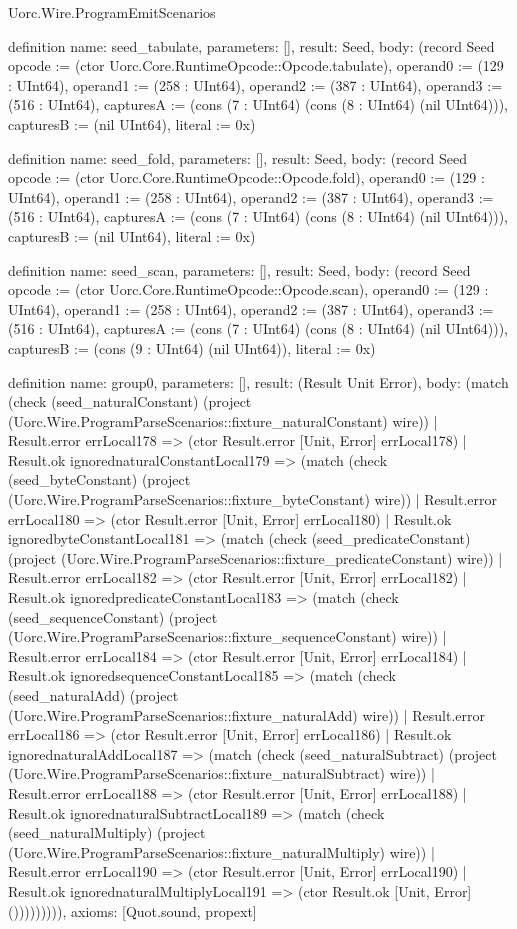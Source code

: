 \begin{lexlean}{Uorc.Wire.ProgramEmitScenarios}
\begin{semanticmodule}
definition{
  name: seed_tabulate,
  parameters: [],
  result: Seed,
  body: (record Seed {opcode := (ctor Uorc.Core.RuntimeOpcode::Opcode.tabulate), operand0 := (129 : UInt64), operand1 := (258 : UInt64), operand2 := (387 : UInt64), operand3 := (516 : UInt64), capturesA := (cons (7 : UInt64) (cons (8 : UInt64) (nil UInt64))), capturesB := (nil UInt64), literal := 0x})
}

definition{
  name: seed_fold,
  parameters: [],
  result: Seed,
  body: (record Seed {opcode := (ctor Uorc.Core.RuntimeOpcode::Opcode.fold), operand0 := (129 : UInt64), operand1 := (258 : UInt64), operand2 := (387 : UInt64), operand3 := (516 : UInt64), capturesA := (cons (7 : UInt64) (cons (8 : UInt64) (nil UInt64))), capturesB := (nil UInt64), literal := 0x})
}

definition{
  name: seed_scan,
  parameters: [],
  result: Seed,
  body: (record Seed {opcode := (ctor Uorc.Core.RuntimeOpcode::Opcode.scan), operand0 := (129 : UInt64), operand1 := (258 : UInt64), operand2 := (387 : UInt64), operand3 := (516 : UInt64), capturesA := (cons (7 : UInt64) (cons (8 : UInt64) (nil UInt64))), capturesB := (cons (9 : UInt64) (nil UInt64)), literal := 0x})
}

definition{
  name: group0,
  parameters: [],
  result: (Result Unit Error),
  body: (match (check (seed_naturalConstant) (project (Uorc.Wire.ProgramParseScenarios::fixture_naturalConstant) wire))
    | Result.error errLocal178 => (ctor Result.error [Unit, Error] errLocal178)
    | Result.ok ignorednaturalConstantLocal179 => (match (check (seed_byteConstant) (project (Uorc.Wire.ProgramParseScenarios::fixture_byteConstant) wire))
      | Result.error errLocal180 => (ctor Result.error [Unit, Error] errLocal180)
      | Result.ok ignoredbyteConstantLocal181 => (match (check (seed_predicateConstant) (project (Uorc.Wire.ProgramParseScenarios::fixture_predicateConstant) wire))
        | Result.error errLocal182 => (ctor Result.error [Unit, Error] errLocal182)
        | Result.ok ignoredpredicateConstantLocal183 => (match (check (seed_sequenceConstant) (project (Uorc.Wire.ProgramParseScenarios::fixture_sequenceConstant) wire))
          | Result.error errLocal184 => (ctor Result.error [Unit, Error] errLocal184)
          | Result.ok ignoredsequenceConstantLocal185 => (match (check (seed_naturalAdd) (project (Uorc.Wire.ProgramParseScenarios::fixture_naturalAdd) wire))
            | Result.error errLocal186 => (ctor Result.error [Unit, Error] errLocal186)
            | Result.ok ignorednaturalAddLocal187 => (match (check (seed_naturalSubtract) (project (Uorc.Wire.ProgramParseScenarios::fixture_naturalSubtract) wire))
              | Result.error errLocal188 => (ctor Result.error [Unit, Error] errLocal188)
              | Result.ok ignorednaturalSubtractLocal189 => (match (check (seed_naturalMultiply) (project (Uorc.Wire.ProgramParseScenarios::fixture_naturalMultiply) wire))
                | Result.error errLocal190 => (ctor Result.error [Unit, Error] errLocal190)
                | Result.ok ignorednaturalMultiplyLocal191 => (ctor Result.ok [Unit, Error] ())))))))),
  axioms: [Quot.sound, propext]
}


\end{semanticmodule}
\end{lexlean}
